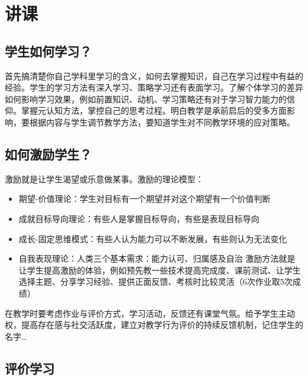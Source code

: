 \documentclass[]{tufte-book}
\providecommand{\tightlist}{%
  \setlength{\itemsep}{0pt}\setlength{\parskip}{0pt}}
\begin{document}
\hypertarget{ux8bb2ux8bfe}{%
\section{讲课}\label{ux8bb2ux8bfe}}

\hypertarget{ux5b66ux751fux5982ux4f55ux5b66ux4e60}{%
\subsection{学生如何学习？}\label{ux5b66ux751fux5982ux4f55ux5b66ux4e60}}

首先搞清楚你自己学科里学习的含义，如何去掌握知识，自己在学习过程中有益的经验。学生的学习方法有深入学习、策略学习还有表面学习。了解个体学习的差异如何影响学习效果，例如前置知识、动机、学习策略还有对于学习智力能力的信仰。掌握元认知方法，掌控自己的思考过程。明白教学是承前启后的受多方面影响，要根据内容与学生调节教学方法，要知道学生对不同教学环境的应对策略。

\hypertarget{ux5982ux4f55ux6fc0ux52b1ux5b66ux751f}{%
\subsection{如何激励学生？}\label{ux5982ux4f55ux6fc0ux52b1ux5b66ux751f}}

激励就是让学生渴望或乐意做某事。激励的理论模型：

\begin{itemize}
\tightlist
\item
  期望-价值理论：学生对目标有一个期望并对这个期望有一个价值判断
\item
  成就目标导向理论：有些人是掌握目标导向，有些是表现目标导向
\item
  成长-固定思维模式：有些人认为能力可以不断发展，有些则认为无法变化
\item
  自我表现理论：人类三个基本需求：能力认可、归属感及自治
  激励方法就是让学生提高激励的体验，例如预先教一些技术提高完成度、课前测试、让学生选择主题、分享学习经验、提供正面反馈、考核时比较灵活（6次作业取5次成绩）
\end{itemize}

在教学时要考虑作业与评价方式，学习活动，反馈还有课堂气氛。给予学生主动权，提高存在感与社交活跃度，建立对教学行为评价的持续反馈机制，记住学生的名字\ldots{}

\hypertarget{ux8bc4ux4ef7ux5b66ux4e60}{%
\subsection{评价学习}\label{ux8bc4ux4ef7ux5b66ux4e60}}
\end{document}
